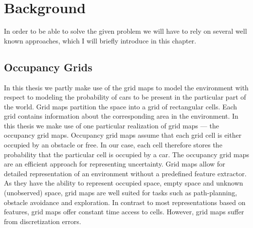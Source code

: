 \chapter{Background} %
    In order to be able to solve the given problem we will have to rely on several
    well known approaches, which I will briefly introduce in this chapter.
    \section{Occupancy Grids}\label{sec:occupancy_grids}

        In this thesis we partly
        make use of the grid maps to model the environment with respect to modeling
        the probability of cars to be present in the particular part of the world.
        Grid maps partition the space into a grid of rectangular cells. Each grid
        contains information about the corresponding area in the environment. In this
        thesis we make use of one particular realization of grid maps --- the
        occupancy grid maps. Occupancy grid maps assume that each grid cell is either
        occupied by an obstacle or free. In our case, each cell therefore stores the
        probability that the particular cell is occupied by a car. The occupancy grid
        maps are an efficient approach for representing uncertainty. Grid maps allow
        for detailed representation of an environment without a predefined feature
        extractor. As they have the ability to represent occupied space, empty space
        and unknown (unobserved) space, grid maps are well suited for tasks such as
        path-planning, obstacle avoidance and exploration. In contrast to most
        representations based on features, grid maps offer constant time access to
        cells. However, grid maps suffer from discretization errors.


